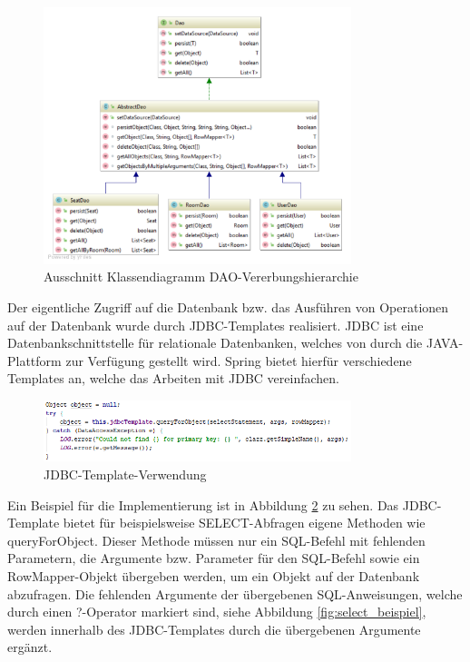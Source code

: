 \begin{figure}[H]
	\centering 
	\includegraphics[width=0.8\textwidth]{img/dao_klassendia}
	\captionsetup{format=hang}
	\caption[Ausschnitt Klassendiagram \ac{DAO}-Vererbungshierarchie]{\label{fig:dao_klassendia}Ausschnitt Klassendiagramm \ac{DAO}-Vererbungshierarchie}
\end{figure}

Der eigentliche Zugriff auf die Datenbank bzw. das Ausführen von Operationen auf der Datenbank wurde durch \ac{JDBC}-Templates realisiert. \ac{JDBC} ist eine Datenbankschnittstelle für relationale Datenbanken, welches von durch die JAVA-Plattform zur Verfügung gestellt wird. \autocite{WikimediaFoundationInc.2019c} Spring bietet hierfür verschiedene Templates an, welche das Arbeiten mit JDBC vereinfachen.\autocite{PivotalSoftwareInc.b} 

\begin{figure}[H]
	\centering 
	\includegraphics[width=0.8\textwidth]{img/jbdc_template_usage}
	\captionsetup{format=hang}
	\caption[\ac{JDBC}-Template-Verwendung]{\label{fig:jbdc_template_usage}\ac{JDBC}-Template-Verwendung}
\end{figure}

Ein Beispiel für die Implementierung ist in Abbildung \ref{fig:jbdc_template_usage} zu sehen. Das \ac{JDBC}-Template bietet für beispielsweise \glqq SELECT\grqq-Abfragen eigene Methoden wie \grqq queryForObject\grqq. Dieser Methode müssen nur ein SQL-Befehl mit fehlenden Parametern, die Argumente bzw. Parameter für den SQL-Befehl sowie ein \glqq RowMapper\grqq-Objekt übergeben werden, um ein Objekt auf der Datenbank abzufragen. Die fehlenden Argumente der übergebenen SQL-Anweisungen, welche durch einen ?-Operator markiert sind, siehe Abbildung \ref{fig:select_beispiel}, werden innerhalb des \ac{JDBC}-Templates durch die übergebenen Argumente ergänzt. 

